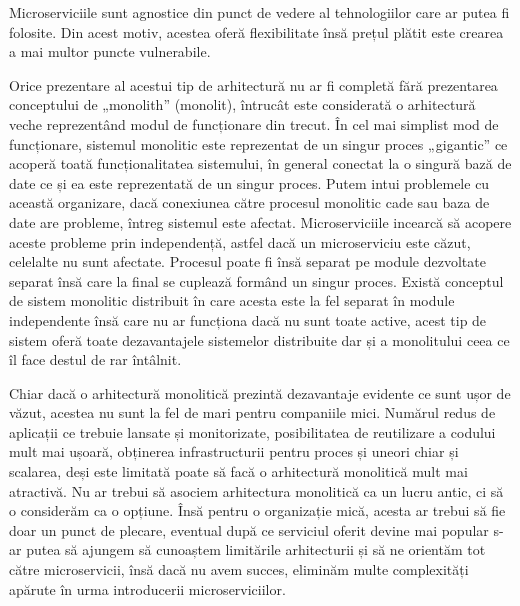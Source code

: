 Microserviciile sunt agnostice din punct de vedere al tehnologiilor care ar putea fi folosite. Din acest motiv, acestea
oferă flexibilitate însă prețul plătit este crearea a mai multor puncte vulnerabile.

Orice prezentare al acestui tip de arhitectură nu ar fi completă fără prezentarea conceptului de „monolith” (monolit), întrucât
este considerată o arhitectură veche reprezentând modul de funcționare din trecut. În cel mai simplist mod de funcționare, 
sistemul monolitic este reprezentat de un singur proces „gigantic” ce acoperă toată funcționalitatea sistemului, în general conectat
la o singură bază de date ce și ea este reprezentată de un singur proces. Putem intui problemele cu această organizare,
dacă conexiunea către procesul monolitic cade sau baza de date are probleme, întreg sistemul este afectat. Microserviciile incearcă 
să acopere aceste probleme prin independență, astfel dacă un microserviciu este căzut, celelalte nu sunt afectate.
Procesul poate fi însă separat pe module dezvoltate separat însă care la final se cuplează formând un singur proces.
Există conceptul de sistem monolitic distribuit în care acesta este la fel separat în module independente însă care nu ar funcționa
dacă nu sunt toate active, acest tip de sistem oferă toate dezavantajele sistemelor distribuite dar și a monolitului ceea 
ce îl face destul de rar întâlnit.
                  
Chiar dacă o arhitectură monolitică prezintă dezavantaje evidente ce sunt ușor de văzut, acestea nu sunt la fel de mari
pentru companiile mici. Numărul redus de aplicații ce trebuie lansate și monitorizate,
posibilitatea de reutilizare a codului mult mai ușoară, obținerea infrastructurii pentru
proces și uneori chiar și scalarea, deși este limitată poate să facă o arhitectură monolitică
mult mai atractivă. Nu ar trebui să asociem arhitectura monolitică ca un lucru antic, ci să 
o considerăm ca o opțiune. Însă pentru o organizație mică, acesta ar trebui să fie doar un
punct de plecare, eventual după ce serviciul oferit devine mai popular s-ar putea să ajungem
să cunoaștem limitările arhitecturii și să ne orientăm tot către microservicii, însă dacă 
nu avem succes, eliminăm multe complexități apărute în urma introducerii microserviciilor.

